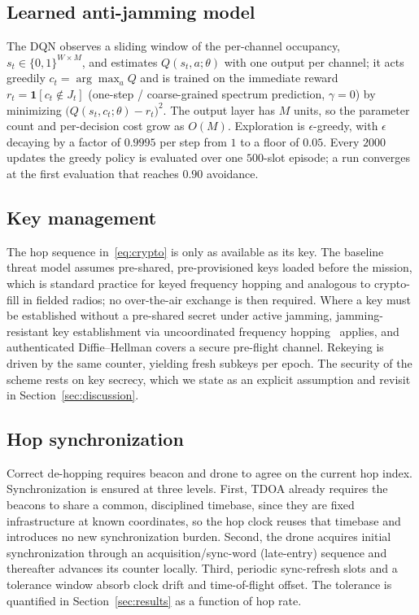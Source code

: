 \documentclass[journal]{IEEEtran}
\begin{document}
\subsection{Learned anti-jamming model}
The DQN observes a sliding window of the per-channel occupancy,
$s_t\in\{0,1\}^{W\times M}$, and estimates $Q(s_t,a;\theta)$ with one output per
channel; it acts greedily $c_t=\arg\max_a Q$ and is trained on the immediate
reward $r_t=\mathbf 1[c_t\notin J_t]$ (one-step / coarse-grained spectrum
prediction, $\gamma{=}0$) by minimizing $\big(Q(s_t,c_t;\theta)-r_t\big)^2$. The
output layer has $M$ units, so the parameter count and per-decision cost grow as
$O(M)$. Exploration is $\epsilon$-greedy, with $\epsilon$ decaying by a factor of
$0.9995$ per step from $1$ to a floor of $0.05$. Every $2000$ updates the greedy
policy is evaluated over one $500$-slot episode; a run converges at the first
evaluation that reaches $0.90$ avoidance.

\subsection{Key management}\label{sec:keys}
The hop sequence in~\eqref{eq:crypto} is only as available as its key. The
baseline threat model assumes pre-shared, pre-provisioned keys loaded before the
mission, which is standard practice for keyed frequency hopping and analogous to
crypto-fill in fielded radios; no over-the-air exchange is then required. Where
a key must be established without a pre-shared secret under active jamming,
jamming-resistant key establishment via uncoordinated frequency
hopping~\cite{ref16} applies, and authenticated Diffie--Hellman covers a secure
pre-flight channel. Rekeying is driven by the same counter, yielding fresh
subkeys per epoch. The security of the scheme rests on key secrecy, which we
state as an explicit assumption and revisit in Section~\ref{sec:discussion}.

\subsection{Hop synchronization}\label{sec:sync}
Correct de-hopping requires beacon and drone to agree on the current hop index.
Synchronization is ensured at three levels. First, TDOA already requires the
beacons to share a common, disciplined timebase, since they are fixed
infrastructure at known coordinates, so the hop clock reuses that timebase and
introduces no new synchronization burden. Second, the drone acquires initial
synchronization through an acquisition/sync-word (late-entry) sequence and
thereafter advances its counter locally. Third, periodic sync-refresh slots and
a tolerance window absorb clock drift and time-of-flight offset. The tolerance
is quantified in Section~\ref{sec:results} as a function of hop rate.
\end{document}
